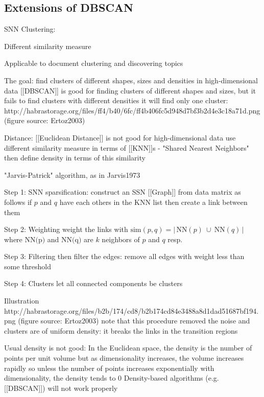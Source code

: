 \subsection{Extensions of DBSCAN} \label{sec:dbscan-ext}

SNN Clustering: \cite{ertoz2003finding}

Different similarity measure

Applicable to document clustering and discovering topics \cite{ertoz2004finding}

The goal:
find clusters of different shapes, sizes and densities in high-dimensional data
 [[DBSCAN]] is good for finding clusters of different shapes and sizes, but it fails to find clusters with different densities
it will find only one cluster:
 http://habrastorage.org/files/ff4/b40/6fc/ff4b406fc5d948d7bf3b2d4e3c18a71d.png
 (figure source: Ertoz2003)


Distance:
 [[Euclidean Distance]] is not good for high-dimensional data
 use different similarity measure in terms of [[KNN]]s - "Shared Nearest Neighbors"
 then define density in terms of this similarity


"Jarvis-Patrick" algorithm, as in Jarvis1973


Step 1: SNN sparsification:
 construct an SSN [[Graph]] from data matrix as follows
 if $p$ and $q$ have each others in the KNN list
 then create a link between them


Step 2: Weighting
 weight the links with $\text{sim}(p, q) = \big| \, \text{NN}(p) \ \cup \ \text{NN}(q) \, \big|$
 where $\text{NN(p)}$ and $\text{NN(q)}$ are $k$ neighbors of $p$ and $q$ resp.


Step 3: Filtering
 then filter the edges:
 remove all edges with weight less than some threshold


Step 4: Clusters
 let all connected components be clusters


Illustration
 http://habrastorage.org/files/b2b/174/cd8/b2b174cd84e3488a8d1dad51687bf194.png
 (figure source: Ertoz2003)
 note that this procedure removed the noise
 and clusters are of uniform density: it breaks the links in the transition regions


Usual density is not good:
 In the Euclidean space, the density is the number of points per unit volume
 but as dimensionality increases, the volume increases rapidly
 so unless the number of points increases exponentially with dimensionality, the density tends to 0
 Density-based algorithms (e.g. [[DBSCAN]]) will not work properly


